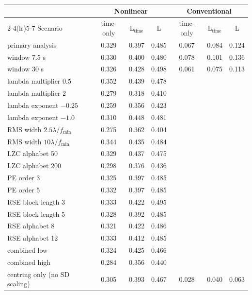 \begin{tabular}{lcccccc}
\toprule
 & \multicolumn{3}{c}{Nonlinear} & \multicolumn{3}{c}{Conventional}\\
\cmidrule(lr){2-4}\cmidrule(lr){5-7}
Scenario & time-only & L$_{\mathrm{time}}$ & L & time-only & L$_{\mathrm{time}}$ & L\\
\midrule
primary analysis & 0.329 & 0.397 & 0.485 & 0.067 & 0.084 & 0.124\\\midrule
window 7.5 s & 0.330 & 0.400 & 0.480 & 0.078 & 0.101 & 0.136\\
window 30 s & 0.326 & 0.428 & 0.498 & 0.061 & 0.075 & 0.113\\
lambda multiplier 0.5 & 0.352 & 0.439 & 0.478 &  &  & \\
lambda multiplier 2 & 0.279 & 0.318 & 0.410 &  &  & \\
lambda exponent $-0.25$ & 0.259 & 0.356 & 0.423 &  &  & \\
lambda exponent $-1.0$ & 0.310 & 0.448 & 0.481 &  &  & \\
RMS width $2.5\lambda/f_{\min}$ & 0.275 & 0.362 & 0.404 &  &  & \\
RMS width $10\lambda/f_{\min}$ & 0.344 & 0.435 & 0.484 &  &  & \\
LZC alphabet 50 & 0.329 & 0.437 & 0.475 &  &  & \\
LZC alphabet 200 & 0.298 & 0.376 & 0.436 &  &  & \\
PE order 3 & 0.325 & 0.397 & 0.485 &  &  & \\
PE order 5 & 0.332 & 0.397 & 0.485 &  &  & \\
RSE block length 3 & 0.333 & 0.422 & 0.495 &  &  & \\
RSE block length 5 & 0.328 & 0.392 & 0.485 &  &  & \\
RSE alphabet 8 & 0.321 & 0.422 & 0.486 &  &  & \\
RSE alphabet 12 & 0.333 & 0.412 & 0.485 &  &  & \\
combined low & 0.324 & 0.425 & 0.466 &  &  & \\
combined high & 0.284 & 0.356 & 0.440 &  &  & \\
\midrule
centring only (no SD scaling) & 0.305 & 0.393 & 0.467 & 0.028 & 0.040 & 0.063\\
\bottomrule
\end{tabular}
